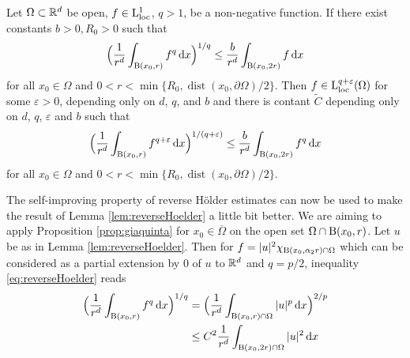   \begin{prop}
    \label{prop:giaquinta}
    Let $\Omega \subset \mathbb{R}^d$ be open, $f \in \mathrm{L}^1_{\mathrm{loc}}$, $q > 1$, be a non-negative function.
    If there exist constants $b > 0, R_0 > 0$ such that
    \begin{align*}
      \Big( \frac{1}{r^d} \int_{\mathrm{B}(x_0, r)} f^q \, {\operatorname{d}\!{x}} \Big)^{1/q} \leq \frac{b}{r^d} \int_{\mathrm{B}(x_0, 2r)} f \, {\operatorname{d}\!{x}}
    \end{align*}
    for all $x_0 \in \Omega$ and $0 < r < \min\{ R_0, \operatorname{dist}(x_0, \partial\Omega)/2\}$.
    Then $f \in \mathrm{L}^{q + \varepsilon}_{\mathrm{loc}}(\Omega)$ for some $\varepsilon > 0$, depending only on $d$, $q$, and $b$ and there is contant $\tilde C$ depending only on $d$, $q$, $\varepsilon$ and $b$ such that
    \begin{align*}
      \Big( \frac{1}{r^d} \int_{\mathrm{B}(x_0, r)} f^{q + \varepsilon} \, {\operatorname{d}\!{x}} \Big)^{1/(q + \varepsilon)} \leq \frac{b}{r^d} \int_{\mathrm{B}(x_0, 2r)} f^q \, {\operatorname{d}\!{x}}
    \end{align*}
    for all $x_0 \in \Omega$ and $0 < r < \min\{R_0, \operatorname{dist}(x_0, \partial\Omega)/2\}$.
  \end{prop}

  \begin{rem}
    The self-improving property of reverse Hölder estimates can now be used to make the result of Lemma \ref{lem:reverseHoelder} a little bit better. 
    We are aiming to apply Proposition \ref{prop:giaquinta} for $x_0 \in \overline\Omega$ on the open set $\Omega \cap \mathrm{B}(x_0, r)$. 
    Let $u$ be as in Lemma \ref{lem:reverseHoelder}. Then for $f = |u|^{2} \chi_{\mathrm{B}(x_0,\alpha_2 r) \cap \Omega}$ which can be considered as a partial extension by $0$ of $u$ to $\mathbb{R}^d$ and $q = p/2$, inequality \eqref{eq:reverseHoelder} reads
    \begin{align*}
      \Big( \frac{1}{r^d} \int_{\mathrm{B}(x_0, r)} f^q \, {\operatorname{d}\!{x}} \Big)^{1/q}
      &= \Big( \frac{1}{r^d} \int_{\mathrm{B}(x_0, r) \cap \Omega} |u|^p \, {\operatorname{d}\!{x}} \Big)^{2/p} \\
      &\leq C^2 \frac{1}{r^d} \int_{\mathrm{B}(x_0, 2r) \cap \Omega} |u|^2 \, {\operatorname{d}\!{x}} 
    \end{align*}
  \end{rem}





